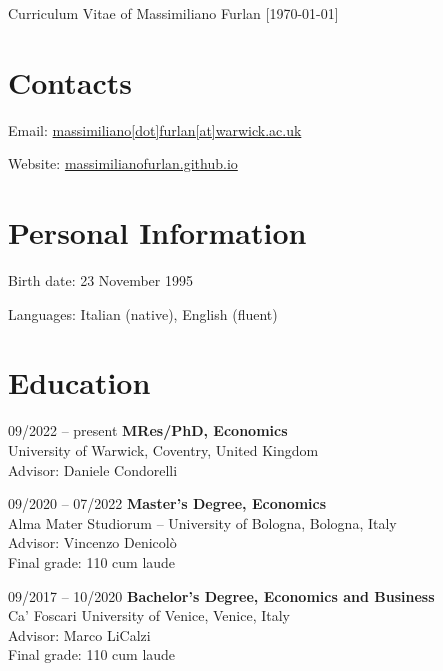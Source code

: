 \documentclass[11pt,a4paper]{article}
\begin{document}
\date{}
\thispagestyle{empty}
\setlength\cvlabelwidth{90pt}

\begin{cv}{\LARGE Curriculum Vitae of Massimiliano Furlan \large{[\mydatestyle\today]}} 

\section{Contacts}

\begin{cvlist}{}
	\itemsep -4pt
	\item[Email:] \href{mailto:massimiliano[dot]furlan[at]warwick.ac.uk}{massimiliano[dot]furlan[at]warwick.ac.uk}
	\item[Website:] \href{https://massimilianofurlan.github.io}{massimilianofurlan.github.io}
\end{cvlist}
\vspace{-20pt}

\section{Personal Information}

\begin{cvlist}{}
	\itemsep -4pt
	\item[Birth date:] 23 November 1995
	\item[Languages:] Italian (native), English (fluent)
\end{cvlist}
\vspace{-20pt}

\section{Education}

\begin{cvlist}{}
	\item[09/2022 -- \hspace{0.1pt} present] \textbf{MRes/PhD, Economics}\\ 
		University of Warwick, Coventry, United Kingdom\\
		Advisor: Daniele Condorelli
	\item[09/2020 -- 07/2022] \textbf{Master's Degree, Economics}\\ 
		Alma Mater Studiorum -- University of Bologna, Bologna, Italy\\
		Advisor: Vincenzo Denicolò\\
		Final grade: 110 cum laude%
	\item[09/2017 -- 10/2020] \textbf{Bachelor's Degree, Economics and Business} \\
		Ca' Foscari University of Venice, Venice, Italy\\
		Advisor: Marco LiCalzi\\
		Final grade: 110 cum laude%
\end{cvlist}
\vspace{-20pt}


\end{cv}
\end{document}
